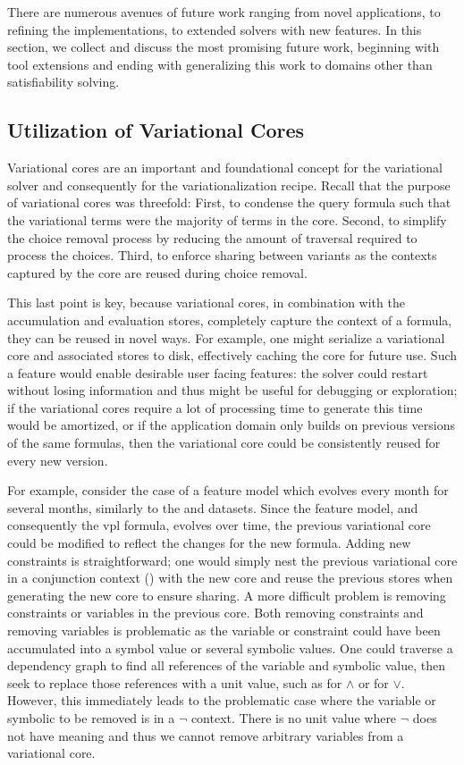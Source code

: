 \label{section:conclusion:future-work}
%
There are numerous avenues of future work ranging from novel applications, to
refining the implementations, to extended solvers with new features. In this
section, we collect and discuss the most promising future work, beginning with
tool extensions and ending with generalizing this work to domains other than
satisfiability solving.

\subsection{Utilization of Variational Cores}
Variational cores are an important and foundational concept for the variational
solver and consequently for the variationalization recipe. Recall that the
purpose of variational cores was threefold: First, to condense the query formula
such that the variational terms were the majority of terms in the core. Second,
to simplify the choice removal process by reducing the amount of traversal
required to process the choices. Third, to enforce sharing between variants as
the contexts captured by the core are reused during choice removal.

This last point is key, because variational cores, in combination with the
accumulation and evaluation stores, completely capture the context of a formula,
they can be reused in novel ways. For example, one might serialize a variational
core and associated stores to disk, effectively caching the core for future use.
Such a feature would enable desirable user facing features: the solver could
restart without losing information and thus might be useful for debugging or
exploration; if the variational cores require a lot of processing time to
generate this time would be amortized, or if the application domain only builds
on previous versions of the same formulas, then the variational core could be
consistently reused for every new version.

For example, consider the case of a feature model which evolves every month for
several months, similarly to the \fin{} and \auto{} datasets. Since the feature
model, and consequently the \ac{vpl} formula, evolves over time, the previous
variational core could be modified to reflect the changes for the new formula.
Adding new constraints is straightforward; one would simply nest the previous
variational core in a conjunction context () with
the new core and reuse the previous stores when generating the new core to
ensure sharing. A more difficult problem is removing constraints or variables in
the previous core. Both removing constraints and removing variables is
problematic as the variable or constraint could have been accumulated into a
symbol value or several symbolic values. One could traverse a dependency graph
to find all references of the variable and symbolic value, then seek to
replace those references with a unit value, such as \tru{} for $\wedge$ or
\fls{} for $\vee$. However, this immediately leads to the problematic case where
the variable or symbolic to be removed is in a $\neg$ context. There is no unit
value where $\neg$ does not have meaning and thus we cannot remove arbitrary
variables from a variational core.

